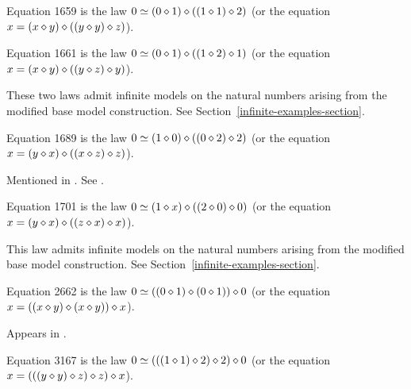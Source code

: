 \begin{definition}[Equation 1659]\label{eq1659}\leanok{}  Equation 1659 is the law $0 \simeq  (0 \diamond 1) \diamond ((1 \diamond 1) \diamond 2)$ (or the equation $x = (x \diamond y) \diamond ((y \diamond y) \diamond z)$).
\end{definition}

\begin{definition}[Equation 1661]\label{eq1661}\leanok{}  Equation 1661 is the law $0 \simeq  (0 \diamond 1) \diamond ((1 \diamond 2) \diamond 1)$ (or the equation $x = (x \diamond y) \diamond ((y \diamond z) \diamond y)$).
\end{definition}

These two laws admit infinite models on the natural numbers arising from the modified base model construction. See Section~\ref{infinite-examples-section}.

\begin{definition}[Equation 1689]\label{eq1689}\leanok{}  Equation 1689 is the law $0 \simeq  (1 \diamond 0) \diamond ((0 \diamond 2) \diamond 2)$ (or the equation $x = (y \diamond x) \diamond ((x \diamond z) \diamond z)$).
\end{definition}

Mentioned in \cite{Kisielewicz2}.  See .

\begin{definition}[Equation 1701]\label{eq1701}\leanok{}  Equation 1701 is the law $0 \simeq  (1 \diamond x) \diamond ((2 \diamond 0) \diamond 0)$ (or the equation $x = (y \diamond x) \diamond ((z \diamond x) \diamond x)$).
\end{definition}

This law admits infinite models on the natural numbers arising from the modified base model construction. See Section~\ref{infinite-examples-section}.

\begin{definition}[Equation 2662]\label{eq2662}\leanok{}  Equation 2662 is the law $0 \simeq  ((0 \diamond 1) \diamond (0 \diamond 1)) \diamond 0$ (or the equation $x = ((x \diamond y) \diamond (x \diamond y)) \diamond x$).
\end{definition}

Appears in \cite{mendelsohn-padmanabhan}.

\begin{definition}[Equation 3167]\label{eq3167}\leanok{}  Equation 3167 is the law $0 \simeq  (((1 \diamond 1) \diamond 2) \diamond 2) \diamond 0$ (or the equation $x = (((y \diamond y) \diamond z) \diamond z) \diamond x$).
\end{definition}


